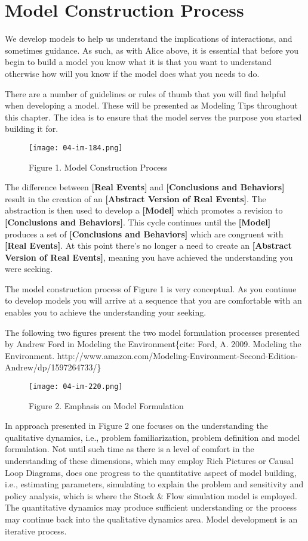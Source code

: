 \documentclass[]{memoir}
\let\Oldincludegraphics\includegraphics
\renewcommand{\includegraphics}[1]{\Oldincludegraphics[max size={\textwidth}{\textheight}]{#1}}
\newcommand{\p}[1]{\textbf{{[}#1{]}}}
\begin{document}
\section{Model Construction Process}

We develop models to help us understand the implications of
interactions, and sometimes guidance. As such, as with Alice above, it
is essential that before you begin to build a model you know what it is
that you want to understand otherwise how will you know if the model
does what you needs to do.

There are a number of guidelines or rules of thumb that you will find
helpful when developing a model. These will be presented as Modeling
Tips throughout this chapter. The idea is to ensure that the model
serves the purpose you started building it for.

\begin{figure}[htbp]
\centering
\texttt{[image: 04-im-184.png]}
\caption{Figure 1. Model Construction Process}
\end{figure}

The difference between \p{Real Events} and \p{Conclusions and Behaviors}
result in the creation of an \p{Abstract Version of Real Events}. The
abstraction is then used to develop a \p{Model} which promotes a
revision to \p{Conclusions and Behaviors}. This cycle continues until
the \p{Model} produces a set of \p{Conclusions and Behaviors} which are
congruent with \p{Real Events}. At this point there's no longer a need
to create an \p{Abstract Version of Real Events}, meaning you have
achieved the understanding you were seeking.

The model construction process of Figure 1 is very conceptual. As you
continue to develop models you will arrive at a sequence that you are
comfortable with an enables you to achieve the understanding your
seeking.

The following two figures present the two model formulation processes
presented by Andrew Ford in Modeling the Environment\{cite: Ford, A.
2009. Modeling the Environment.
http://www.amazon.com/Modeling-Environment-Second-Edition-Andrew/dp/1597264733/\}

\begin{figure}[htbp]
\centering
\texttt{[image: 04-im-220.png]}
\caption{Figure 2. Emphasis on Model Formulation}
\end{figure}

In approach presented in Figure 2 one focuses on the understanding the
qualitative dynamics, i.e., problem familiarization, problem definition
and model formulation. Not until such time as there is a level of
comfort in the understanding of these dimensions, which may employ Rich
Pictures or Causal Loop Diagrams, does one progress to the quantitative
aspect of model building, i.e., estimating parameters, simulating to
explain the problem and sensitivity and policy analysis, which is where
the Stock \& Flow simulation model is employed. The quantitative
dynamics may produce sufficient understanding or the process may
continue back into the qualitative dynamics area. Model development is
an iterative process.
\end{document}
